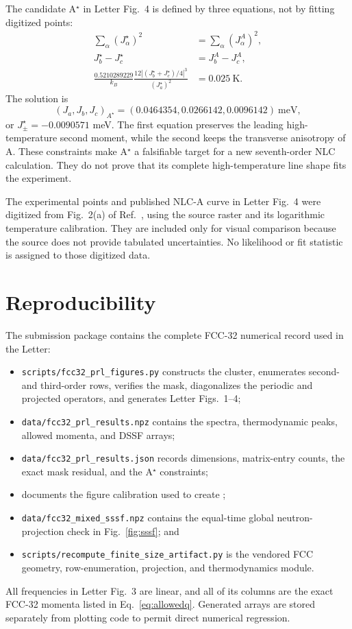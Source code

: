 \documentclass[aps,prl,onecolumn,amsmath,amssymb,superscriptaddress]{revtex4-2}
\newcommand{\Jpm}{J_{\pm}}
\begin{document}
The candidate A$^\star$ in Letter Fig.~4 is defined by three equations,
not by fitting digitized points:
\begin{align}
 \sum_\alpha(J_\alpha^\star)^2&=\sum_\alpha(J_\alpha^A)^2,\\
 J_b^\star-J_c^\star&=J_b^A-J_c^A,\\
 \frac{0.5210289229}{k_B}
 \frac{12|(J_b^\star+J_c^\star)/4|^3}{(J_a^\star)^2}
 &=0.025\ \mathrm{K}.
\end{align}
The solution is
\begin{equation}
 (J_a,J_b,J_c)_{A^\star}=
 (0.0464354,0.0266142,0.0096142)\ \mathrm{meV},
\end{equation}
or $\Jpm^\star=-0.0090571$ meV. The first equation preserves the leading
high-temperature second moment, while the second keeps the transverse
anisotropy of A. These constraints make A$^\star$ a falsifiable target for
a new seventh-order NLC calculation. They do not prove that its complete
high-temperature line shape fits the experiment.

The experimental points and published NLC-A curve in Letter Fig.~4 were
digitized from Fig.~2(a) of Ref.~\cite{Smith2025}, using the source raster and
its logarithmic temperature calibration. They are included only for visual
comparison because the source does not provide tabulated uncertainties. No
likelihood or fit statistic is assigned to those digitized data.

\section{Reproducibility}
\label{sec:repro}

The submission package contains the complete FCC-32 numerical record used in
the Letter:
\begin{itemize}
\item \texttt{scripts/fcc32\_prl\_figures.py} constructs the cluster,
enumerates second- and third-order rows, verifies the mask, diagonalizes the
periodic and projected operators, and generates Letter Figs.~1--4;
\item \texttt{data/fcc32\_prl\_results.npz} contains the spectra,
thermodynamic peaks, allowed momenta, and DSSF arrays;
\item \texttt{data/fcc32\_prl\_results.json} records dimensions, matrix-entry
counts, the exact mask residual, and the A$^\star$ constraints;
\item {} documents the
figure calibration used to create
;
\item \texttt{data/fcc32\_mixed\_sssf.npz} contains the equal-time global
neutron-projection check in Fig.~\ref{fig:sssf}; and
\item \texttt{scripts/recompute\_finite\_size\_artifact.py} is the vendored
FCC geometry, row-enumeration, projection, and thermodynamics module.
\end{itemize}

All frequencies in Letter Fig.~3 are linear, and all of its columns are the
exact FCC-32 momenta listed in Eq.~\eqref{eq:allowedq}. Generated arrays are
stored separately from plotting code to permit direct numerical regression.


\end{document}
